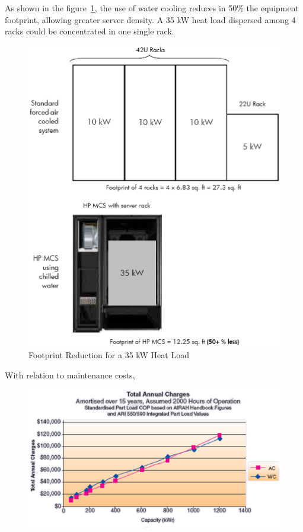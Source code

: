 {                As shown in the figure~\ref{fig:footprint_reduction_for_35_heat_load}, the use of water cooling reduces in 50\% the equipment footprint, allowing greater server density. A 35 kW heat load dispersed among 4 racks could be concentrated in one single rack.
                
                \begin{figure}[h!tb]
                    \centering
                    \includegraphics[scale=0.5]{graphics/footprint_reduction_for_35_heat_load}
                    \caption{Footprint Reduction for a 35 kW Heat Load}
                    \label{fig:footprint_reduction_for_35_heat_load}
                \end{figure}
                With relation to maintenance costs,
                \begin{figure}[h!tb]
                    \centering
                    \includegraphics[scale=0.8]{graphics/economic_crossover_annualized}

\end{figure}}
